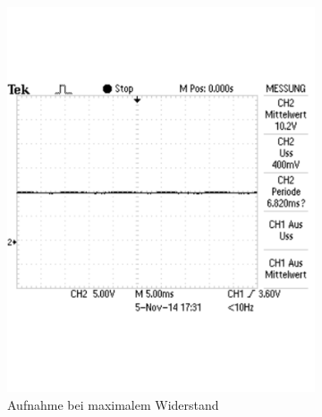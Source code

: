 \documentclass[12pt,a4paper]{article}
\begin{document}
\begin{figure}[H]
        \centering
        \begin{subfigure}[b]{0.48\textwidth}
                \includegraphics[width=\textwidth , scale = 0.4]{2_6_1000F_1.pdf}
                \caption[Aufnahme bei maximalem Widerstand]{Aufnahme bei maximalem Widerstand}
 				 \label{fig:2_6_1000F_1}
        \end{subfigure}%
        \hfill
        \begin{subfigure}[b]{0.48\textwidth}

\end{subfigure}
\end{figure}
\end{document}
